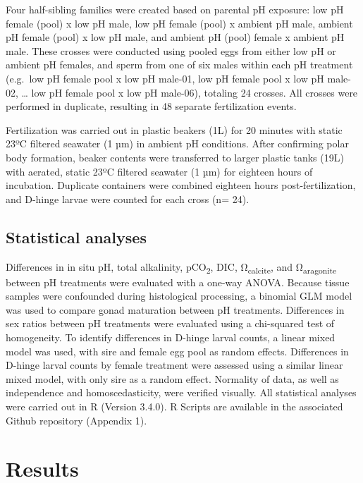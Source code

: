 \documentclass [11pt, proquest] {uwthesis}[2015/03/03]
\begin{document}
Four half-sibling families were created based on parental pH exposure: low pH female (pool) x low pH male, low pH female (pool) x ambient pH male, ambient pH female (pool) x low pH male, and ambient pH (pool) female x ambient pH male. These crosses were conducted using pooled eggs from either low pH or ambient pH females, and sperm from one of six males within each pH treatment (e.g.~low pH female pool x low pH male-01, low pH female pool x low pH male-02, \ldots{} low pH female pool x low pH male-06), totaling 24 crosses. All crosses were performed in duplicate, resulting in 48 separate fertilization events.

Fertilization was carried out in plastic beakers (1L) for 20 minutes with static 23ºC filtered seawater (1 µm) in ambient pH conditions. After confirming polar body formation, beaker contents were transferred to larger plastic tanks (19L) with aerated, static 23ºC filtered seawater (1 µm) for eighteen hours of incubation. Duplicate containers were combined eighteen hours post-fertilization, and D-hinge larvae were counted for each cross (n= 24).

\hypertarget{statistical-analyses}{%
\subsection{Statistical analyses}\label{statistical-analyses}}

Differences in in situ pH, total alkalinity, pCO\textsubscript{2}, DIC, Ω\textsubscript{calcite}, and Ω\textsubscript{aragonite} between pH treatments were evaluated with a one-way ANOVA. Because tissue samples were confounded during histological processing, a binomial GLM model was used to compare gonad maturation between pH treatments. Differences in sex ratios between pH treatments were evaluated using a chi-squared test of homogeneity. To identify differences in D-hinge larval counts, a linear mixed model was used, with sire and female egg pool as random effects. Differences in D-hinge larval counts by female treatment were assessed using a similar linear mixed model, with only sire as a random effect. Normality of data, as well as independence and homoscedasticity, were verified visually. All statistical analyses were carried out in R (Version 3.4.0). R Scripts are available in the associated Github repository (Appendix 1).

\hypertarget{results-1}{%
\section{Results}\label{results-1}}
\end{document}
